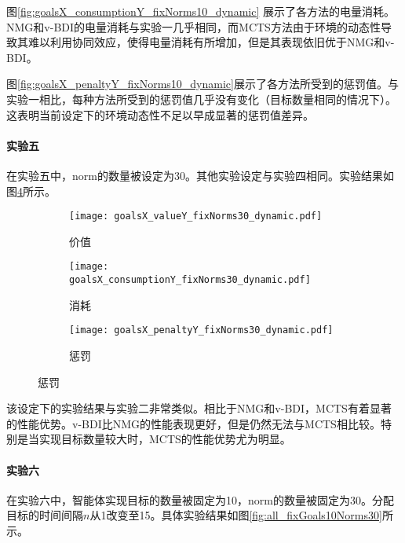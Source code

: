 图\ref{fig:goalsX_consumptionY_fixNorms10_dynamic} 展示了各方法的电量消耗。NMG和v-BDI的电量消耗与实验一几乎相同，而MCTS方法由于环境的动态性导致其难以利用协同效应，使得电量消耗有所增加，但是其表现依旧优于NMG和v-BDI。

图\ref{fig:goalsX_penaltyY_fixNorms10_dynamic}展示了各方法所受到的惩罚值。与实验一相比，每种方法所受到的惩罚值几乎没有变化（目标数量相同的情况下）。这表明当前设定下的环境动态性不足以早成显著的惩罚值差异。

\paragraph{实验五}
在实验五中，norm的数量被设定为30。其他实验设定与实验四相同。实验结果如图\ref{fig:all_fixNorms30_dynamic}所示。
\begin{figure}
\centering
\begin{subfigure}{.47\textwidth}
  \centering
  \texttt{[image: goalsX\_valueY\_fixNorms30\_dynamic.pdf]}
  \captionsetup{justification=centering}
  \caption{价值}
  \label{fig:goalsX_valueY_fixNorms30_dynamic}
\end{subfigure}

\begin{subfigure}{.47\textwidth}
  \centering
  \texttt{[image: goalsX\_consumptionY\_fixNorms30\_dynamic.pdf]}
  \captionsetup{justification=centering}
  \caption{消耗}
  \label{fig:goalsX_consumptionY_fixNorms30_dynamic}
\end{subfigure}
\begin{subfigure}{.47\textwidth}
  \centering
  \texttt{[image: goalsX\_penaltyY\_fixNorms30\_dynamic.pdf]}
  \captionsetup{justification=centering}
  \caption{惩罚}
  \label{fig:goalsX_penaltyY_fixNorms30_dynamic}
\end{subfigure}
\captionsetup{justification=centering}
\label{fig:all_fixNorms30_dynamic}
\end{figure}

该设定下的实验结果与实验二非常类似。相比于NMG和v-BDI，MCTS有着显著的性能优势。v-BDI比NMG的性能表现更好，但是仍然无法与MCTS相比较。特别是当实现目标数量较大时，MCTS的性能优势尤为明显。

\paragraph{实验六}
在实验六中，智能体实现目标的数量被固定为10，norm的数量被固定为30。分配目标的时间间隔$n$从1改变至15。具体实验结果如图\ref{fig:all_fixGoals10Norms30}所示。

